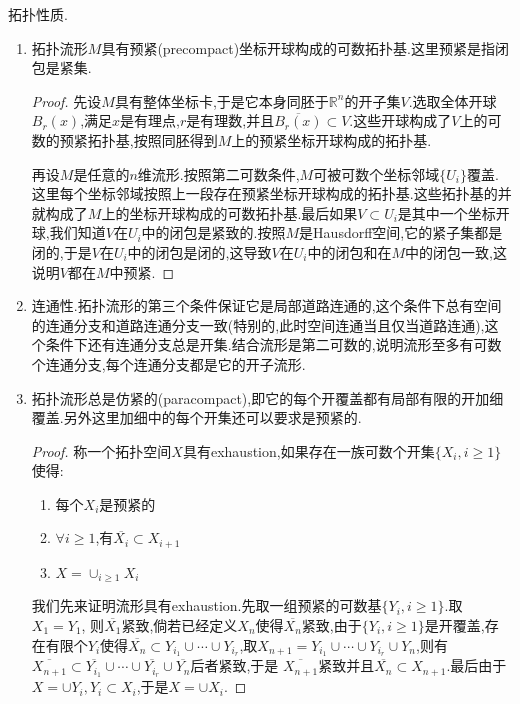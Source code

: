 拓扑性质.
\begin{enumerate}
	\item 拓扑流形$M$具有预紧(precompact)坐标开球构成的可数拓扑基.这里预紧是指闭包是紧集.
	\begin{proof}
		
		先设$M$具有整体坐标卡,于是它本身同胚于$\mathbb{R}^n$的开子集$V$.选取全体开球$B_r(x)$,满足$x$是有理点,$r$是有理数,并且$\overline{B_r(x)}\subset V$.这些开球构成了$V$上的可数的预紧拓扑基,按照同胚得到$M$上的预紧坐标开球构成的拓扑基.
		
		\qquad
		
		再设$M$是任意的$n$维流形.按照第二可数条件,$M$可被可数个坐标邻域$\{U_i\}$覆盖.这里每个坐标邻域按照上一段存在预紧坐标开球构成的拓扑基.这些拓扑基的并就构成了$M$上的坐标开球构成的可数拓扑基.最后如果$V\subset U_i$是其中一个坐标开球,我们知道$V$在$U_i$中的闭包是紧致的.按照$M$是Hausdorff空间,它的紧子集都是闭的,于是$V$在$U_i$中的闭包是闭的,这导致$V$在$U_i$中的闭包和在$M$中的闭包一致,这说明$V$都在$M$中预紧.
	\end{proof}
    \item 连通性.拓扑流形的第三个条件保证它是局部道路连通的,这个条件下总有空间的连通分支和道路连通分支一致(特别的,此时空间连通当且仅当道路连通),这个条件下还有连通分支总是开集.结合流形是第二可数的,说明流形至多有可数个连通分支,每个连通分支都是它的开子流形.
    \item 拓扑流形总是仿紧的(paracompact),即它的每个开覆盖都有局部有限的开加细覆盖.另外这里加细中的每个开集还可以要求是预紧的.
    \begin{proof}
    	
    	称一个拓扑空间$X$具有exhaustion,如果存在一族可数个开集$\{X_i,i\ge1\}$使得:
    	\begin{enumerate}
    		\item 每个$X_i$是预紧的
    		\item $\forall i\ge1$,有$\overline{X_{i}}\subset X_{i+1}$
    		\item $X=\cup_{i\ge1}X_i$
    	\end{enumerate}
    	
    	我们先来证明流形具有exhaustion.先取一组预紧的可数基$\{Y_i,i\ge1\}$.取$X_1=Y_1$,
    	则$\overline{X_1}$紧致,倘若已经定义$X_n$使得$\overline{X_n}$紧致,由于$\{Y_i,i\ge1\}$是开覆盖,存在有限个$Y_i$使得$\overline{X_n}\subset Y_{i_1}\cup\cdots\cup Y_{i_r}$,取$X_{n+1}=Y_{i_1}\cup\cdots\cup Y_{i_r}\cup Y_n$,则有
    	$\overline{X_{n+1}}\subset \overline{Y_{i_1}}\cup\cdots\cup \overline{Y_{i_r}}\cup \overline{Y_n}$后者紧致,于是
    	$\overline{X_{n+1}}$紧致并且$\overline{X_n}\subset X_{n+1}$.最后由于$X=\cup Y_i,Y_i\subset X_i$,于是$X=\cup X_i$.
    	

\end{proof}
\end{enumerate}
